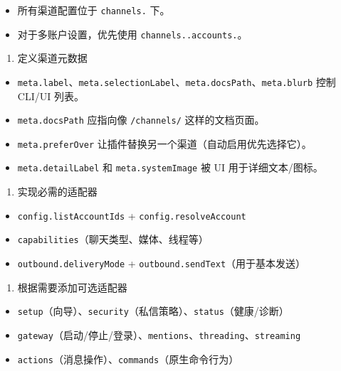 \begin{itemize}
  \item 所有渠道配置位于 \texttt{channels.} 下。
  \item 对于多账户设置，优先使用 \texttt{channels..accounts.}。
\end{itemize}


\begin{enumerate}
  \item 定义渠道元数据
\end{enumerate}


\begin{itemize}
  \item \texttt{meta.label}、\texttt{meta.selectionLabel}、\texttt{meta.docsPath}、\texttt{meta.blurb} 控制 CLI/UI 列表。
  \item \texttt{meta.docsPath} 应指向像 \texttt{/channels/} 这样的文档页面。
  \item \texttt{meta.preferOver} 让插件替换另一个渠道（自动启用优先选择它）。
  \item \texttt{meta.detailLabel} 和 \texttt{meta.systemImage} 被 UI 用于详细文本/图标。
\end{itemize}


\begin{enumerate}
  \item 实现必需的适配器
\end{enumerate}


\begin{itemize}
  \item \texttt{config.listAccountIds} + \texttt{config.resolveAccount}
  \item \texttt{capabilities}（聊天类型、媒体、线程等）
  \item \texttt{outbound.deliveryMode} + \texttt{outbound.sendText}（用于基本发送）
\end{itemize}


\begin{enumerate}
  \item 根据需要添加可选适配器
\end{enumerate}


\begin{itemize}
  \item \texttt{setup}（向导）、\texttt{security}（私信策略）、\texttt{status}（健康/诊断）
  \item \texttt{gateway}（启动/停止/登录）、\texttt{mentions}、\texttt{threading}、\texttt{streaming}
  \item \texttt{actions}（消息操作）、\texttt{commands}（原生命令行为）
\end{itemize}


